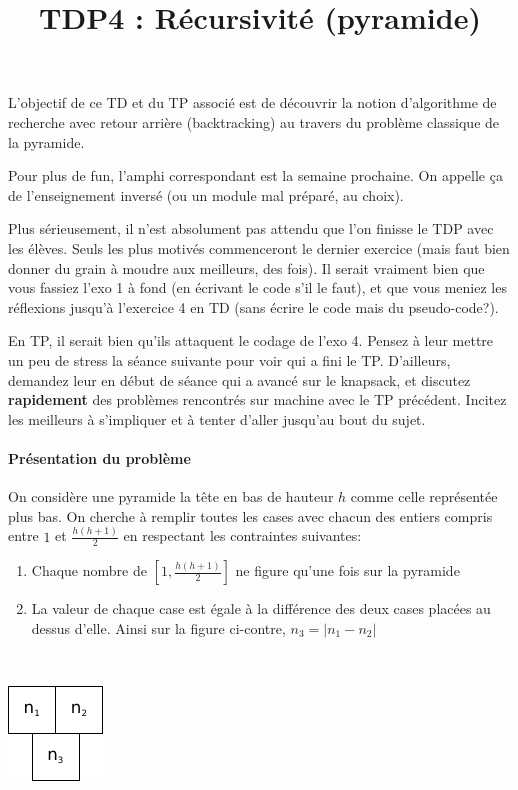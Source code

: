 \documentclass[10pt]{article}\usepackage[nu]{esial}
\begin{document}
\color{black}
\title{TDP4 : Récursivité (pyramide)}
\maketitle

L'objectif de ce TD et du TP associé est de découvrir la notion d'algorithme de
recherche avec retour arrière (backtracking) au travers du problème classique de
la pyramide.

\begin{Reponse}
  Pour plus de fun, l'amphi correspondant est la semaine prochaine. On appelle
  ça de l'enseignement inversé (ou un module mal préparé, au choix).

  Plus sérieusement, il n'est absolument pas attendu que l'on finisse le TDP
  avec les élèves. Seuls les plus motivés commenceront le dernier exercice (mais
  faut bien donner du grain à moudre aux meilleurs, des fois). Il serait
  vraiment bien que vous fassiez l'exo 1 à fond (en écrivant le code s'il le
  faut), et que vous meniez les réflexions jusqu'à l'exercice 4 en TD (sans
  écrire le code mais du pseudo-code?).

  En TP, il serait bien qu'ils attaquent le codage de l'exo 4. Pensez à leur
  mettre un peu de stress la séance suivante pour voir qui a fini le
  TP. D'ailleurs, demandez leur en début de séance qui a avancé sur le knapsack,
  et discutez \textbf{rapidement} des problèmes rencontrés sur machine avec le
  TP précédent. Incitez les meilleurs à s'impliquer et à tenter d'aller jusqu'au
  bout du sujet.
\end{Reponse}


\paragraph{Présentation du problème}

On considère une pyramide la tête en bas de hauteur $h$ comme celle
représentée plus bas. On cherche à remplir toutes les cases avec chacun des
entiers compris entre $1$ et $\frac{h(h+1)}{2}$ en respectant les contraintes
suivantes:

\begin{minipage}{.8\linewidth}
\begin{enumerate}
\item Chaque nombre de $\left[1,\frac{h(h+1)}{2}\right]$ ne figure qu'une fois sur la pyramide
\item La valeur de chaque case est égale à la différence des deux cases placées
  au dessus d'elle.
  Ainsi sur la figure ci-contre, $n_3=|n_1 - n_2|$
\end{enumerate}  
\end{minipage}~\begin{minipage}{.2\linewidth}
  \centering
  \includegraphics{img/pyramide3.pdf} 
\end{minipage}
\end{document}
